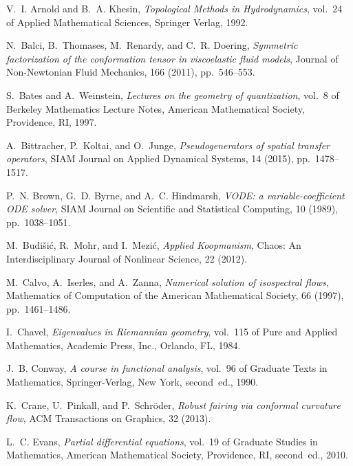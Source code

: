\documentclass[final,leqno]{siamart}
\begin{document}


\begin{thebibliography}{10}

{\sc V.~I. Arnold and B.~A. Khesin}, {\em Topological Methods in
  Hydrodynamics}, vol.~24 of Applied Mathematical Sciences, Springer Verlag,
  1992.

{\sc N.~Balci, B.~Thomases, M.~Renardy, and C.~R. Doering}, {\em Symmetric
  factorization of the conformation tensor in viscoelastic fluid models},
  Journal of Non-Newtonian Fluid Mechanics, 166 (2011), pp.~546--553.

{\sc S.~Bates and A.~Weinstein}, {\em Lectures on the geometry of
  quantization}, vol.~8 of Berkeley Mathematics Lecture Notes, American
  Mathematical Society, Providence, RI, 1997.

{\sc A.~Bittracher, P.~Koltai, and O.~Junge}, {\em Pseudogenerators of spatial
  transfer operators}, SIAM Journal on Applied Dynamical Systems, 14 (2015),
  pp.~1478--1517.

{\sc P.~N. Brown, G.~D. Byrne, and A.~C. Hindmarsh}, {\em V{ODE}: a
  variable-coefficient {ODE} solver}, SIAM Journal on Scientific and Statistical Computing, 10 (1989),
  pp.~1038--1051.

{\sc M.~Budi{\v s}i{\'c}, R.~Mohr, and I.~Mezi{\'c}}, {\em Applied Koopmanism},
  Chaos: An Interdisciplinary Journal of Nonlinear Science, 22 (2012).

{\sc M.~Calvo, A.~Iserles, and A.~Zanna}, {\em Numerical solution of
  isospectral flows}, Mathematics of Computation of the American Mathematical
  Society, 66 (1997), pp.~1461--1486.

{\sc I.~Chavel}, {\em Eigenvalues in {R}iemannian geometry}, vol.~115 of Pure
  and Applied Mathematics, Academic Press, Inc., Orlando, FL, 1984.

{\sc J.~B. Conway}, {\em A course in functional analysis}, vol.~96 of Graduate
  Texts in Mathematics, Springer-Verlag, New York, second~ed., 1990.

{\sc K.~Crane, U.~Pinkall, and P.~Schr\"{o}der}, {\em Robust fairing via
  conformal curvature flow}, ACM Transactions on Graphics, 32 (2013).

{\sc L.~C. Evans}, {\em Partial differential equations}, vol.~19 of Graduate
  Studies in Mathematics, American Mathematical Society, Providence, RI,
  second~ed., 2010.


\end{thebibliography}
\end{document}
